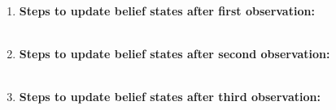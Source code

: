 \documentclass{article}
\begin{document}
\begin{enumerate}

    \item {\textbf{Steps to update belief states after first observation:}}\\\\
    \item {\textbf{Steps to update belief states after second observation:}}\\\\
    \item {\textbf{Steps to update belief states after third observation:}}\\\\
    

    
\end{enumerate}
\end{document}

